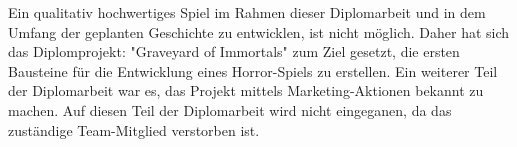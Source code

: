 Ein qualitativ hochwertiges Spiel im Rahmen dieser Diplomarbeit und in dem Umfang der geplanten Geschichte
zu entwicklen, ist nicht möglich.
Daher hat sich das Diplomprojekt: "Graveyard of Immortals" zum Ziel gesetzt, die ersten Bausteine für die Entwicklung
eines Horror-Spiels zu erstellen.
Ein weiterer Teil der Diplomarbeit war es, das Projekt mittels Marketing-Aktionen bekannt zu machen.
Auf diesen Teil der Diplomarbeit wird nicht eingeganen, da das zuständige Team-Mitglied verstorben ist.
